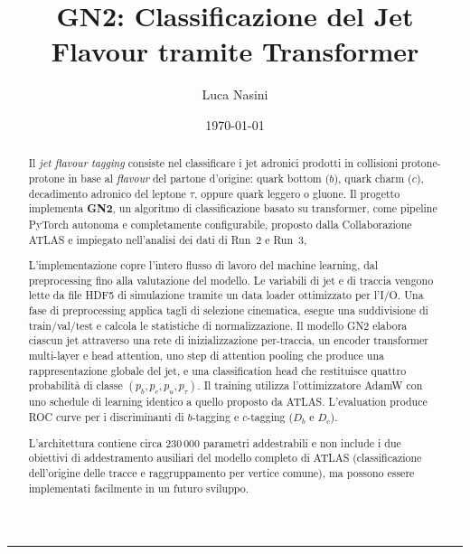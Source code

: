 \documentclass[11pt,a4paper]{article}
\title{GN2: Classificazione del Jet Flavour tramite Transformer}
\date{\today}
\author{Luca Nasini}
\begin{document}
\maketitle

\vspace{4pt}
\hrule
\vspace{10pt}

\begin{abstract}
Il \textit{jet flavour tagging} consiste nel classificare i jet adronici prodotti in collisioni protone-protone in base al \textit{flavour} del partone d'origine:
quark bottom ($b$), quark charm ($c$), decadimento adronico del leptone $\tau$, oppure quark leggero o gluone.
Il progetto implementa \textbf{GN2}, un algoritmo di classificazione basato su transformer, come pipeline PyTorch autonoma e completamente configurabile, proposto dalla Collaborazione ATLAS e impiegato nell'analisi dei dati di Run~2 e Run~3,

L'implementazione copre l'intero flusso di lavoro del machine learning, dal preprocessing fino alla valutazione del modello.
Le variabili di jet e di traccia vengono lette da file HDF5 di simulazione tramite un data loader ottimizzato per l'I/O.
Una fase di preprocessing applica tagli di selezione cinematica, esegue una suddivisione di train/val/test e calcola le statistiche di normalizzazione.
Il modello GN2 elabora ciascun jet attraverso una rete di inizializzazione per-traccia, un encoder transformer multi-layer e head attention, uno step di attention pooling che produce una rappresentazione globale del jet, e una classification head che restituisce quattro probabilità di classe $(p_b, p_c, p_u, p_\tau)$.
Il training utilizza l'ottimizzatore AdamW con uno schedule di learning identico a quello proposto da ATLAS.
L'evaluation produce ROC curve per i discriminanti di $b$-tagging e $c$-tagging ($D_b$ e $D_c$).

L'architettura contiene circa $230\,000$ parametri addestrabili e non include i due obiettivi di addestramento ausiliari del modello completo di ATLAS (classificazione dell'origine delle tracce e raggruppamento per vertice comune), ma possono essere implementati facilmente in un futuro sviluppo.
\end{abstract}
\end{document}
